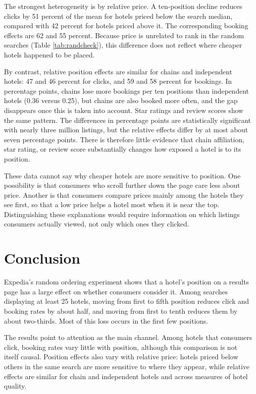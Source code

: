 \documentclass[12pt]{article}
\begin{document}
The strongest heterogeneity is by relative price. A ten-position decline reduces clicks by 51 percent of the mean for hotels priced below the search median, compared with 42 percent for hotels priced above it. The corresponding booking effects are 62 and 55 percent. Because price is unrelated to rank in the random searches (Table \ref{tab:randcheck}), this difference does not reflect where cheaper hotels happened to be placed.

By contrast, relative position effects are similar for chains and independent hotels: 47 and 46 percent for clicks, and 59 and 58 percent for bookings. In percentage points, chains lose more bookings per ten positions than independent hotels (0.36 versus 0.25), but chains are also booked more often, and the gap disappears once this is taken into account. Star ratings and review scores show the same pattern. The differences in percentage points are statistically significant with nearly three million listings, but the relative effects differ by at most about seven percentage points. There is therefore little evidence that chain affiliation, star rating, or review score substantially changes how exposed a hotel is to its position.

These data cannot say why cheaper hotels are more sensitive to position. One possibility is that consumers who scroll further down the page care less about price. Another is that consumers compare prices mainly among the hotels they see first, so that a low price helps a hotel most when it is near the top. Distinguishing these explanations would require information on which listings consumers actually viewed, not only which ones they clicked.

\section{Conclusion}

Expedia's random ordering experiment shows that a hotel's position on a results page has a large effect on whether consumers consider it. Among searches displaying at least 25 hotels, moving from first to fifth position reduces click and booking rates by about half, and moving from first to tenth reduces them by about two-thirds. Most of this loss occurs in the first few positions.

The results point to attention as the main channel. Among hotels that consumers click, booking rates vary little with position, although this comparison is not itself causal. Position effects also vary with relative price: hotels priced below others in the same search are more sensitive to where they appear, while relative effects are similar for chain and independent hotels and across measures of hotel quality.
\end{document}
